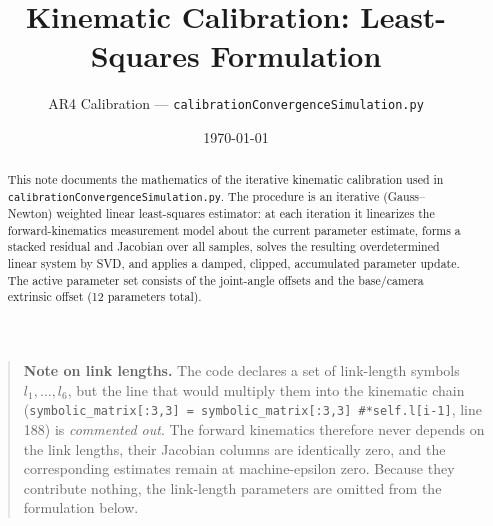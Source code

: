 \documentclass[11pt]{article}
\title{Kinematic Calibration: Least-Squares Formulation}
\author{AR4 Calibration --- \texttt{calibrationConvergenceSimulation.py}}
\date{\today}
\begin{document}
\maketitle

\begin{abstract}
This note documents the mathematics of the iterative kinematic calibration used in
\texttt{calibrationConvergenceSimulation.py}. The procedure is an iterative
(Gauss--Newton) weighted linear least-squares estimator: at each iteration it
linearizes the forward-kinematics measurement model about the current parameter
estimate, forms a stacked residual and Jacobian over all samples, solves the
resulting overdetermined linear system by SVD, and applies a damped, clipped,
accumulated parameter update. The active parameter set consists of the joint-angle
offsets and the base/camera extrinsic offset (12 parameters total).
\end{abstract}

\begin{quote}
\small\textbf{Note on link lengths.} The code declares a set of link-length symbols
$l_1,\dots,l_6$, but the line that would multiply them into the kinematic chain
(\texttt{symbolic\_matrix[:3,3] = symbolic\_matrix[:3,3]\,\#*self.l[i-1]}, line 188) is
\emph{commented out}. The forward kinematics therefore never depends on the link
lengths, their Jacobian columns are identically zero, and the corresponding estimates
remain at machine-epsilon zero. Because they contribute nothing, the link-length
parameters are omitted from the formulation below.
\end{quote}
\end{document}
